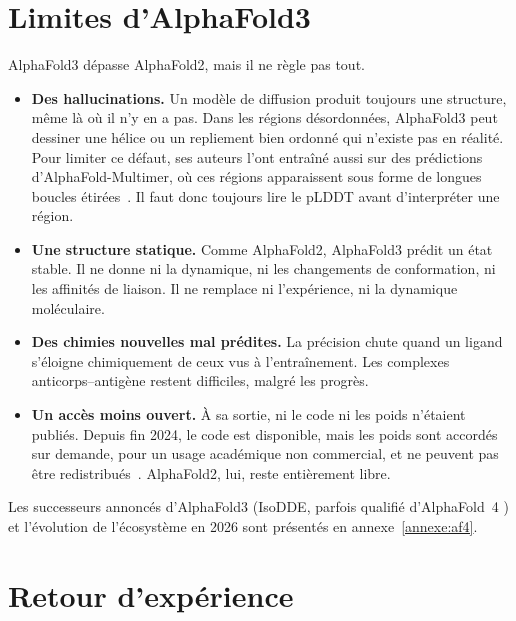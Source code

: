 
\section{Limites d'AlphaFold3}

AlphaFold3 dépasse AlphaFold2, mais il ne règle pas tout.
\begin{itemize}
  \item \textbf{Des hallucinations.} Un modèle de diffusion produit toujours une structure, même là où il n'y en a pas. Dans les régions désordonnées, AlphaFold3 peut dessiner une hélice ou un repliement bien ordonné qui n'existe pas en réalité. Pour limiter ce défaut, ses auteurs l'ont entraîné aussi sur des prédictions d'AlphaFold-Multimer, où ces régions apparaissent sous forme de longues boucles étirées~\cite{abramson2024}. Il faut donc toujours lire le pLDDT avant d'interpréter une région.
  \item \textbf{Une structure statique.} Comme AlphaFold2, AlphaFold3 prédit un état stable. Il ne donne ni la dynamique, ni les changements de conformation, ni les affinités de liaison. Il ne remplace ni l'expérience, ni la dynamique moléculaire.
  \item \textbf{Des chimies nouvelles mal prédites.} La précision chute quand un ligand s'éloigne chimiquement de ceux vus à l'entraînement. Les complexes anticorps--antigène restent difficiles, malgré les progrès.
  \item \textbf{Un accès moins ouvert.} À sa sortie, ni le code ni les poids n'étaient publiés. Depuis fin 2024, le code est disponible, mais les poids sont accordés sur demande, pour un usage académique non commercial, et ne peuvent pas être redistribués~\cite{alphafold3_github}. AlphaFold2, lui, reste entièrement libre.
\end{itemize}
Les successeurs annoncés d'AlphaFold3 (IsoDDE, parfois qualifié d'\og AlphaFold~4 \fg{}) et l'évolution de l'écosystème en 2026 sont présentés en annexe~\ref{annexe:af4}.

\section{Retour d'expérience}

